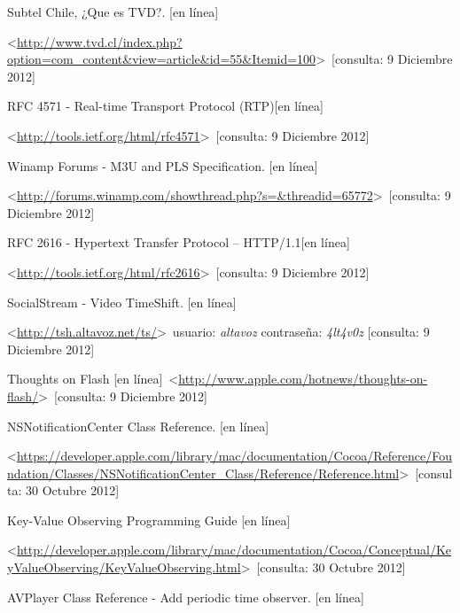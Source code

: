 
\begin{thebibliography}{99}
\begin{sloppypar}



%
Subtel Chile, ¿Que es TVD?. [en línea]\

\textless \url{http://www.tvd.cl/index.php?option=com_content&view=article&id=55&Itemid=100}\textgreater \ [consulta: 9 Diciembre 2012]

%
RFC 4571 - Real-time Transport Protocol (RTP)[en línea]\

\textless \url{http://tools.ietf.org/html/rfc4571}\textgreater \ [consulta: 9 Diciembre 2012]

%
Winamp Forums - M3U and PLS Specification. [en línea]\

\textless \url{http://forums.winamp.com/showthread.php?s=&threadid=65772}\textgreater \ [consulta: 9 Diciembre 2012]

%
RFC 2616 - Hypertext Transfer Protocol -- HTTP/1.1[en línea]\

\textless \url{http://tools.ietf.org/html/rfc2616}\textgreater \ [consulta: 9 Diciembre 2012]

%
SocialStream - Video TimeShift. [en línea]\

\textless \url{http://tsh.altavoz.net/ts/}\textgreater \ usuario: \textit{altavoz} contraseña: \textit{4lt4v0z} [consulta: 9 Diciembre 2012]

%
Thoughts on Flash [en línea]\
\textless \url{http://www.apple.com/hotnews/thoughts-on-flash/}\textgreater \ [consulta: 9 Diciembre 2012]

%
NSNotificationCenter Class Reference. [en línea]\

\textless \url{https://developer.apple.com/library/mac/documentation/Cocoa/Reference/Foundation/Classes/NSNotificationCenter_Class/Reference/Reference.html}\textgreater \ [consulta: 30 Octubre 2012]

Key-Value Observing Programming Guide [en línea]\

\textless \url{http://developer.apple.com/library/mac/documentation/Cocoa/Conceptual/KeyValueObserving/KeyValueObserving.html}\textgreater \ [consulta: 30 Octubre 2012]

%
AVPlayer Class Reference - Add periodic time observer. [en línea]\


\end{sloppypar}
\end{thebibliography}
